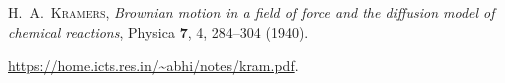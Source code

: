 \documentclass{article}
\begin{document}

\begin{thebibliography}{9}

 \textsc{H.~A.~Kramers}, \textit{Brownian motion in a field
of force and the diffusion model of chemical reactions}, Physica \textbf{7}, 4,
284--304 (1940).

 \url{https://home.icts.res.in/\~abhi/notes/kram.pdf}.


\end{thebibliography}
\end{document}

